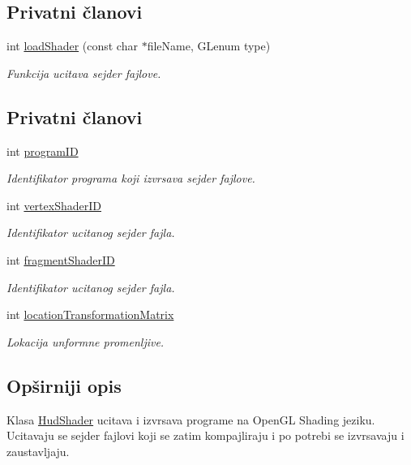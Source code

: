 \subsection*{Privatni članovi}
\begin{DoxyCompactItemize}
\item 
int \hyperlink{classshader_1_1HudShader_a585d2f65b6effa66d2f4b68b34f781b4}{load\+Shader} (const char $\ast$file\+Name, G\+Lenum type)
\begin{DoxyCompactList}\small\item\em Funkcija ucitava sejder fajlove. \end{DoxyCompactList}\end{DoxyCompactItemize}
\subsection*{Privatni članovi}
\begin{DoxyCompactItemize}
\item 
int \hyperlink{classshader_1_1HudShader_ab5aa088991bd6559ba174f553977342f}{program\+ID}
\begin{DoxyCompactList}\small\item\em Identifikator programa koji izvrsava sejder fajlove. \end{DoxyCompactList}\item 
int \hyperlink{classshader_1_1HudShader_a02815d5a104a7d94707cfdf33d8bf22c}{vertex\+Shader\+ID}
\begin{DoxyCompactList}\small\item\em Identifikator ucitanog sejder fajla. \end{DoxyCompactList}\item 
int \hyperlink{classshader_1_1HudShader_a2fec1c7c6e31bbb086e937838443b021}{fragment\+Shader\+ID}
\begin{DoxyCompactList}\small\item\em Identifikator ucitanog sejder fajla. \end{DoxyCompactList}\item 
int \hyperlink{classshader_1_1HudShader_a12942279494ff23209eeb01af8e861e5}{location\+Transformation\+Matrix}
\begin{DoxyCompactList}\small\item\em Lokacija unformne promenljive. \end{DoxyCompactList}\end{DoxyCompactItemize}


\subsection{Opširniji opis}
Klasa \hyperlink{classshader_1_1HudShader}{Hud\+Shader} ucitava i izvrsava programe na Open\+GL Shading jeziku. Ucitavaju se sejder fajlovi koji se zatim kompajliraju i po potrebi se izvrsavaju i zaustavljaju. 

